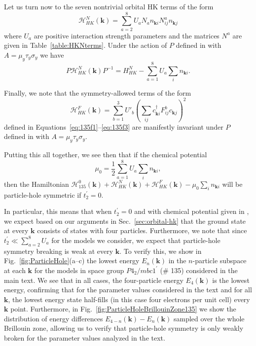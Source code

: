 \documentclass[prb,aps,amssymb,twocolumn,notitlepage]{revtex4-2}
\begin{document}
Let us turn now to the seven nontrivial orbital HK terms of the form
\begin{equation}
\mathcal{H}_{HK}^{N}(\mathbf{k}) = \sum_{a=2}^8U_a N_a n_{\mathbf{k}i}N^a_{ij}n_{\mathbf{k}j}
\end{equation}
where $U_a$ are positive interaction strength parameters and the matrices $N^a$ are given in Table~\ref{table:HKNterms}. 
Under the action of $P$ defined in  with $A=\mu_y\tau_y\sigma_y$ we have
\begin{equation}
P\mathcal{H}_{HK}^{N}(\mathbf{k})P^{-1} = H_{HK}^N - \sum_{a=1}^{8}U_a \sum_{i} n_{\mathbf{k}i}.
\end{equation}

Finally, we note that the symmetry-allowed terms of the form
\begin{equation}
\mathcal{H}^{F}_{HK}(\mathbf{k}) = \sum_{b=1}^{3}U'_b \left(\sum_{ij}c^\dag_{\mathbf{k}i}F^b_{ij}c_{\mathbf{k}j}\right)^2
\end{equation}
defined in Equations~\eqref{eq:135f1}--\eqref{eq:135f3} are manifestly invariant under $P$ defined in  with $A=\mu_y\tau_y\sigma_y$.

Putting this all together, we see then that if the chemical potential
\begin{equation}\label{eq:135musym}
\mu_0 = \frac{1}{2}\sum_{a=1}^{8}U_a \sum_{i}n_{\mathbf{k}i},
\end{equation}
then the Hamiltonian $\mathcal{H}_{135}^{0}(\mathbf{k})+\mathcal{H}_{HK}^{N}(\mathbf{k})+\mathcal{H}^F_{HK}(\mathbf{k}) -\mu_0 \sum_{i} n_{\mathbf{k}i}$ will be particle-hole symmetric if $t_2^\prime=0$.

In particular, this means that when $t_2^\prime=0$ and with chemical potential given in , we expect based on our arguments in Sec.~\ref{sec:orbital-hk} that the ground state at every $\mathbf{k}$ consists of states with four particles. 
Furthermore, we note that since $t_2^\prime \ll \sum_{a=2}^{8} U_a$ for the models we consider, we expect that particle-hole symmetry breaking is weak at every $\mathbf{k}$. 
To verify this, we show in Fig.~\ref{fig:ParticleHole}(a--c) the lowest energy $E_n(\mathbf{k})$ in the $n$-particle subspace at each $\mathbf{k}$ for the models in space group $P4_2/mbc1^\prime$ (\# 135) considered in the main text. 
We see that in all cases, the four-particle energy $E_4(\mathbf{k})$ is the lowest energy, confirming that for the parameter values considered in the text and for all $\mathbf{k}$, the lowest energy state half-fills (in this case four electrons per unit cell) every $\mathbf{k}$ point. 
Furthermore, in Fig.~\ref{fig:ParticleHoleBrillouinZone135} we show the distribution of energy differences $E_{4-n}(\mathbf{k})-E_n(\mathbf{k})$ sampled over the whole Brillouin zone, allowing us to verify that particle-hole symmetry is only weakly broken for the parameter values analyzed in the text.
\end{document}
